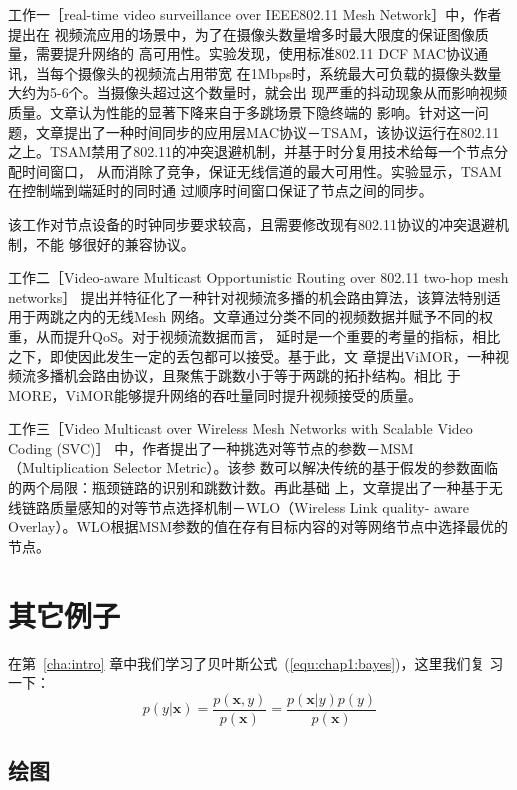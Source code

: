 工作一［real-time video surveillance over IEEE802.11 Mesh Network］中，作者提出在
视频流应用的场景中，为了在摄像头数量增多时最大限度的保证图像质量，需要提升网络的
高可用性。实验发现，使用标准802.11 DCF MAC协议通讯，当每个摄像头的视频流占用带宽
在1Mbps时，系统最大可负载的摄像头数量大约为5-6个。当摄像头超过这个数量时，就会出
现严重的抖动现象从而影响视频质量。文章认为性能的显著下降来自于多跳场景下隐终端的
影响。针对这一问题，文章提出了一种时间同步的应用层MAC协议－TSAM，该协议运行在802.11
之上。TSAM禁用了802.11的冲突退避机制，并基于时分复用技术给每一个节点分配时间窗口，
从而消除了竞争，保证无线信道的最大可用性。实验显示，TSAM在控制端到端延时的同时通
过顺序时间窗口保证了节点之间的同步。

该工作对节点设备的时钟同步要求较高，且需要修改现有802.11协议的冲突退避机制，不能
够很好的兼容协议。

工作二［Video-aware Multicast Opportunistic Routing over 802.11 two-hop mesh networks］
提出并特征化了一种针对视频流多播的机会路由算法，该算法特别适用于两跳之内的无线Mesh
网络。文章通过分类不同的视频数据并赋予不同的权重，从而提升QoS。对于视频流数据而言，
延时是一个重要的考量的指标，相比之下，即使因此发生一定的丢包都可以接受。基于此，文
章提出ViMOR，一种视频流多播机会路由协议，且聚焦于跳数小于等于两跳的拓扑结构。相比
于MORE，ViMOR能够提升网络的吞吐量同时提升视频接受的质量。

工作三［Video Multicast over Wireless Mesh Networks with Scalable Video Coding (SVC)］
中，作者提出了一种挑选对等节点的参数－MSM（Multiplication Selector Metric）。该参
数可以解决传统的基于假发的参数面临的两个局限：瓶颈链路的识别和跳数计数。再此基础
上，文章提出了一种基于无线链路质量感知的对等节点选择机制－WLO（Wireless Link quality-
aware Overlay）。WLO根据MSM参数的值在存有目标内容的对等网络节点中选择最优的节点。






\section{其它例子}
\label{sec:other}

在第~\ref{cha:intro} 章中我们学习了贝叶斯公式~(\ref{equ:chap1:bayes})，这里我们复
习一下：
\begin{equation}
\label{equ:chap2:bayes}
p(y|\mathbf{x}) = \frac{p(\mathbf{x},y)}{p(\mathbf{x})}=
\frac{p(\mathbf{x}|y)p(y)}{p(\mathbf{x})}
\end{equation}

\subsection{绘图}
\label{sec:draw}

